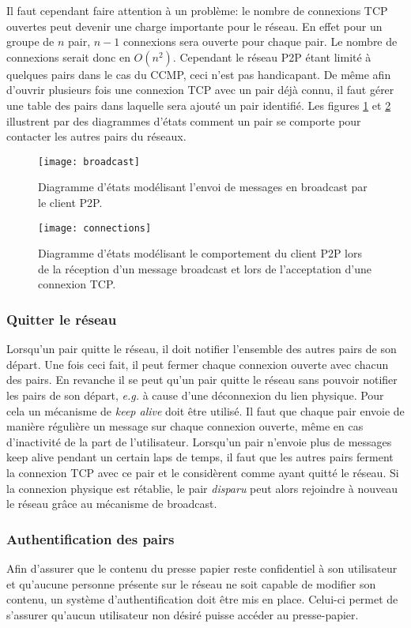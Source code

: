 Il faut cependant faire attention à un
problème: le nombre de connexions TCP ouvertes peut devenir une charge
importante pour le réseau. En effet pour un groupe de $n$ pair, $n-1$
connexions sera ouverte pour chaque pair. Le nombre de connexions serait donc
en $O(n^2)$. Cependant le réseau P2P étant limité à quelques pairs dans le
cas du CCMP, ceci n'est pas handicapant.
De même afin d'ouvrir plusieurs fois une connexion TCP avec un pair déjà
connu, il faut gérer une table des pairs dans laquelle sera ajouté un
pair identifié. Les figures \ref{fig:broadcast} et \ref{fig:connections}
illustrent par des diagrammes d'états comment un pair se comporte pour
contacter les autres pairs du réseaux.

\begin{figure}[!h]
  \centering
  \texttt{[image: broadcast]}
  \caption{Diagramme d'états modélisant l'envoi de messages en broadcast
    par le client P2P.}
  \label{fig:broadcast}
\end{figure}

\begin{figure}[!h]
  \centering
  \texttt{[image: connections]}
  \caption{Diagramme d'états modélisant le comportement du client P2P lors
    de la réception d'un message broadcast et lors de l'acceptation d'une
    connexion TCP.}
  \label{fig:connections}
\end{figure}

\subsubsection{Quitter le réseau}
Lorsqu'un pair quitte le réseau, il doit notifier l'ensemble des autres
pairs de son départ. Une fois ceci fait, il peut fermer chaque connexion
ouverte avec chacun des pairs. En revanche il se peut qu'un pair quitte
le réseau sans pouvoir notifier les pairs de son départ, \emph{e.g.}
à cause d'une déconnexion du lien physique. Pour cela un mécanisme
de \emph{keep alive} doit être utilisé. Il faut que chaque pair envoie
de manière régulière un message sur chaque connexion ouverte, même en cas
d'inactivité de la part de l'utilisateur. Lorsqu'un pair n'envoie plus
de messages keep alive pendant un certain laps de temps, il faut que les
autres pairs ferment la connexion TCP avec ce pair et le considèrent comme
ayant quitté le réseau. Si la connexion physique est rétablie, le pair
\emph{disparu} peut alors rejoindre à nouveau le réseau grâce au mécanisme
de broadcast.

\subsubsection{Authentification des pairs}
Afin d'assurer que le contenu du presse papier reste confidentiel à son
utilisateur et qu'aucune personne présente sur le réseau ne soit capable de
modifier son contenu, un système d'authentification doit être mis en place.
Celui-ci permet de s'assurer qu'aucun utilisateur non désiré puisse accéder au
presse-papier.

